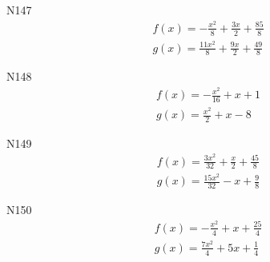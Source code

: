 \documentclass[11pt]{report}
\begin{document}
N147
\begin{align*}
 f(x) = - \frac{x^{2}}{8} + \frac{3 x}{2} + \frac{85}{8}\\
 g(x) = \frac{11 x^{2}}{8} + \frac{9 x}{2} + \frac{49}{8}
\end{align*}

N148
\begin{align*}
 f(x) = - \frac{x^{2}}{16} + x + 1\\
 g(x) = \frac{x^{2}}{2} + x - 8
\end{align*}

N149
\begin{align*}
 f(x) = \frac{3 x^{2}}{32} + \frac{x}{2} + \frac{45}{8}\\
 g(x) = \frac{15 x^{2}}{32} - x + \frac{9}{8}
\end{align*}

N150
\begin{align*}
 f(x) = - \frac{x^{2}}{4} + x + \frac{25}{4}\\
 g(x) = \frac{7 x^{2}}{4} + 5 x + \frac{1}{4}
\end{align*}
\end{document}
